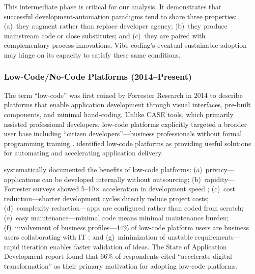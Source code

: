 \documentclass[preprint,12pt,authoryear]{elsarticle}
\begin{document}
This intermediate phase is critical for our analysis. It demonstrates that successful development-automation paradigms tend to share three properties: (a)~they augment rather than replace developer agency; (b)~they produce mainstream code or close substitutes; and (c)~they are paired with complementary process innovations. Vibe coding's eventual sustainable adoption may hinge on its capacity to satisfy these same conditions.

\subsubsection{Low-Code/No-Code Platforms (2014--Present)}

The term ``low-code'' was first coined by Forrester Research in 2014 \citep{Richardson2014} to describe platforms that enable application development through visual interfaces, pre-built components, and minimal hand-coding. Unlike CASE tools, which primarily assisted professional developers, low-code platforms explicitly targeted a broader user base including ``citizen developers''---business professionals without formal programming training \citep{OutSystems2019}. \citet{Richardson2016} identified low-code platforms as providing useful solutions for automating and accelerating application delivery.

\citet{Sanchis2020} systematically documented the benefits of low-code platforms: (a)~privacy---applications can be developed internally without outsourcing; (b)~rapidity---Forrester surveys showed 5--10$\times$ acceleration in development speed \citep{Richardson2016}; (c)~cost reduction---shorter development cycles directly reduce project costs; (d)~complexity reduction---apps are configured rather than coded from scratch; (e)~easy maintenance---minimal code means minimal maintenance burden; (f)~involvement of business profiles---44\% of low-code platform users are business users collaborating with IT \citep{OutSystems2019}; and (g)~minimization of unstable requirements---rapid iteration enables faster validation of ideas. The State of Application Development report \citep{OutSystems2019} found that 66\% of respondents cited ``accelerate digital transformation'' as their primary motivation for adopting low-code platforms.
\end{document}
